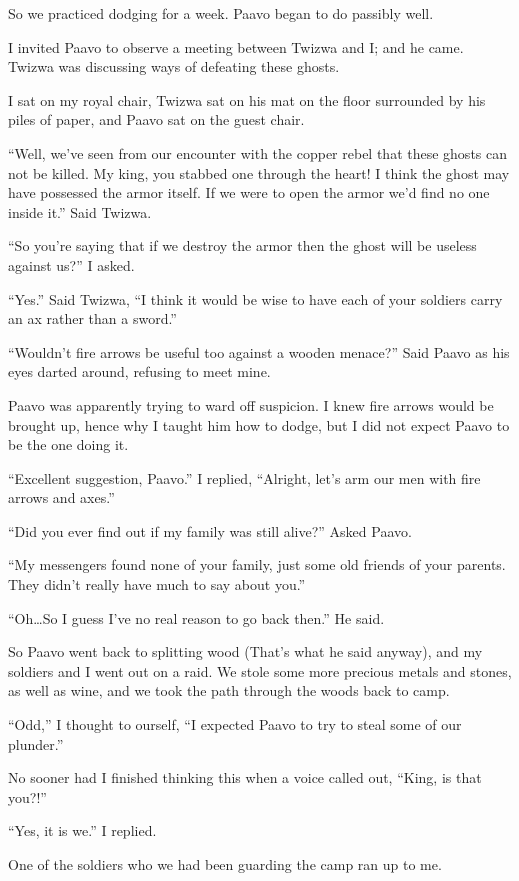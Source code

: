So we practiced dodging for a week. Paavo began to do passibly well.

I invited Paavo to observe a meeting between Twizwa and I; and he came. Twizwa was discussing ways of defeating these ghosts.

I sat on my royal chair, Twizwa sat on his mat on the floor surrounded by his piles of paper, and Paavo sat on the guest chair.

``Well, we've seen from our encounter with the copper rebel that these ghosts can not be killed. My king, you stabbed one through the heart! I think the ghost may have possessed the armor itself. If we were to open the armor we'd find no one inside it.'' Said Twizwa.

``So you're saying that if we destroy the armor then the ghost will be useless against us?'' I asked.

``Yes.'' Said Twizwa, ``I think it would be wise to have each of your soldiers carry an ax rather than a sword.''

``Wouldn't fire arrows be useful too against a wooden menace?'' Said Paavo as his eyes darted around, refusing to meet mine.

Paavo was apparently trying to ward off suspicion. I knew fire arrows would be brought up, hence why I taught him how to dodge, but I did not expect Paavo to be the one doing it.

``Excellent suggestion, Paavo.'' I replied, ``Alright, let's arm our men with fire arrows and axes.''

``Did you ever find out if my family was still alive?'' Asked Paavo.

``My messengers found none of your family, just some old friends of your parents. They didn't really have much to say about you.''

``Oh\ldots So I guess I've no real reason to go back then.'' He said.

So Paavo went back to splitting wood (That's what he said anyway), and my soldiers and I went out on a raid.
We stole some more precious metals and stones, as well as wine, and we took the path through the woods back to camp.

``Odd,'' I thought to ourself, ``I expected Paavo to try to steal some of our plunder.''

No sooner had I finished thinking this when a voice called out, ``King, is that you?!''

``Yes, it is we.'' I replied.

One of the soldiers who we had been guarding the camp ran up to me.

